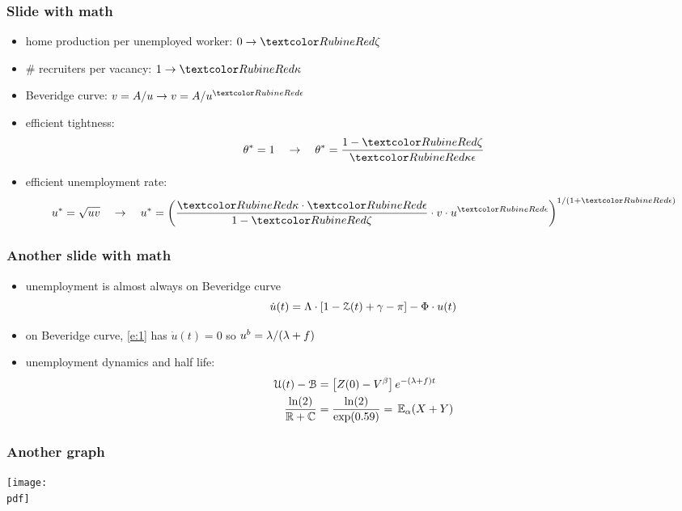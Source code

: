 \documentclass[12pt,xcolor={dvipsnames},hyperref={pdftex,pdfpagemode=UseNone,hidelinks,pdfdisplaydoctitle=true},usepdftitle=false]{beamer}
\def\pdf{figures.pdf}
\begin{document}
\begin{frame}
\end{frame}

\begin{frame}
\frametitle{Slide with math}
\begin{itemize}
\item home production per unemployed worker: $0 \to \al{\z}$
\item \# recruiters per vacancy: $1 \to \al{\k}$
\item Beveridge curve: $v = A/u \to v = A/u^{\al{\e}}$
\item efficient tightness: 
\begin{equation*}
\t^* = 1 \quad\to\quad \t^* = \frac{1-\al{\z}}{\al{\k\e}}
\end{equation*}
\item efficient unemployment rate:
\begin{equation*}
u^* = \sqrt{uv} \quad\to\quad u^* =\bp{\frac{\al{\k} \cdot \al{\e}}{1-\al{\z}}\cdot v\cdot u^{\al{\e}}}^{1/(1+\al{\e})}
\end{equation*}
\end{itemize}
\end{frame}

\begin{frame}
\frametitle{Another slide with math}
\begin{itemize}
\item unemployment is almost always on Beveridge curve
\begin{equation}
\dot{u}(t) = \Lambda \cdot [1-\mathcal{Z}(t) + \gamma - \pi] - \Phi \cdot u(t)
\label{e:1}\end{equation}
\item on Beveridge curve, \eqref{e:1} has $\dot{u}(t)=0$ so $u^b = \lambda/(\lambda+f)$
\item unemployment dynamics and half life: 
\begin{align*}
\Uc(t) - \Bc &= \bs{Z(0) - V^\b} e^{-(\l+f)t}\\
\frac{\ln(2)}{\R+\C} & = \frac{\ln(2)}{\exp(0.59)} = \E[\a]{X + Y}
\end{align*}
\end{itemize}	
\end{frame}

\begin{frame}
\frametitle{Another graph}
\texttt{[image: \\pdf]}%
\end{frame}

\lastslide
\end{document}
